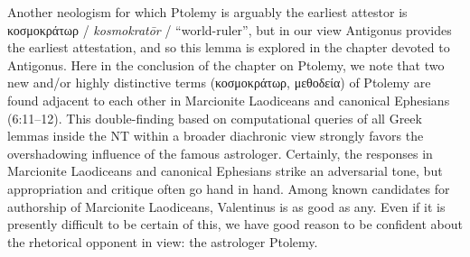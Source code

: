  Another neologism for which Ptolemy is arguably the earliest attestor is %
 κοσμοκράτωρ / \textit{kosmokratōr} / “world-ruler”, %
 but in our view Antigonus provides the earliest attestation, %
 and so this lemma is explored in the chapter devoted to Antigonus. %
 Here in the conclusion of the chapter on Ptolemy, %
 we note that two new and/or highly distinctive terms (κοσμοκράτωρ, μεθοδεία) of Ptolemy %
 are found adjacent to each other in Marcionite Laodiceans and canonical Ephesians (6:11--12). %
 This double-finding based on computational queries of all Greek lemmas inside the NT %
 within a broader diachronic view strongly favors the overshadowing influence of the famous astrologer. %
 Certainly, the responses in Marcionite Laodiceans and canonical Ephesians strike an adversarial tone, %
 but appropriation and critique often go hand in hand. %
 Among known candidates for authorship of Marcionite Laodiceans, Valentinus is as good as any. %
 Even if it is presently difficult to be certain of this, %
 we have good reason to be confident about the rhetorical opponent in view: the astrologer Ptolemy. %